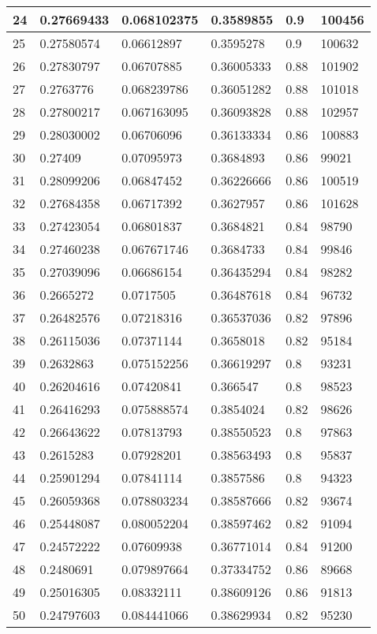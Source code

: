 \begin{longtable}{|l|l|l|l|l|l|}
24 & 0.27669433 & 0.068102375 & 0.3589855 & 0.9 & 100456 \\ \hline 
25 & 0.27580574 & 0.06612897 & 0.3595278 & 0.9 & 100632 \\ \hline 
26 & 0.27830797 & 0.06707885 & 0.36005333 & 0.88 & 101902 \\ \hline 
27 & 0.2763776 & 0.068239786 & 0.36051282 & 0.88 & 101018 \\ \hline 
28 & 0.27800217 & 0.067163095 & 0.36093828 & 0.88 & 102957 \\ \hline 
29 & 0.28030002 & 0.06706096 & 0.36133334 & 0.86 & 100883 \\ \hline 
30 & 0.27409 & 0.07095973 & 0.3684893 & 0.86 & 99021 \\ \hline 
31 & 0.28099206 & 0.06847452 & 0.36226666 & 0.86 & 100519 \\ \hline 
32 & 0.27684358 & 0.06717392 & 0.3627957 & 0.86 & 101628 \\ \hline 
33 & 0.27423054 & 0.06801837 & 0.3684821 & 0.84 & 98790 \\ \hline 
34 & 0.27460238 & 0.067671746 & 0.3684733 & 0.84 & 99846 \\ \hline 
35 & 0.27039096 & 0.06686154 & 0.36435294 & 0.84 & 98282 \\ \hline 
36 & 0.2665272 & 0.0717505 & 0.36487618 & 0.84 & 96732 \\ \hline 
37 & 0.26482576 & 0.07218316 & 0.36537036 & 0.82 & 97896 \\ \hline 
38 & 0.26115036 & 0.07371144 & 0.3658018 & 0.82 & 95184 \\ \hline 
39 & 0.2632863 & 0.075152256 & 0.36619297 & 0.8 & 93231 \\ \hline 
40 & 0.26204616 & 0.07420841 & 0.366547 & 0.8 & 98523 \\ \hline 
41 & 0.26416293 & 0.075888574 & 0.3854024 & 0.82 & 98626 \\ \hline 
42 & 0.26643622 & 0.07813793 & 0.38550523 & 0.8 & 97863 \\ \hline 
43 & 0.2615283 & 0.07928201 & 0.38563493 & 0.8 & 95837 \\ \hline 
44 & 0.25901294 & 0.07841114 & 0.3857586 & 0.8 & 94323 \\ \hline 
45 & 0.26059368 & 0.078803234 & 0.38587666 & 0.82 & 93674 \\ \hline 
46 & 0.25448087 & 0.080052204 & 0.38597462 & 0.82 & 91094 \\ \hline 
47 & 0.24572222 & 0.07609938 & 0.36771014 & 0.84 & 91200 \\ \hline 
48 & 0.2480691 & 0.079897664 & 0.37334752 & 0.86 & 89668 \\ \hline 
49 & 0.25016305 & 0.08332111 & 0.38609126 & 0.86 & 91813 \\ \hline 
50 & 0.24797603 & 0.084441066 & 0.38629934 & 0.82 & 95230 \\ \hline 
\end{longtable}